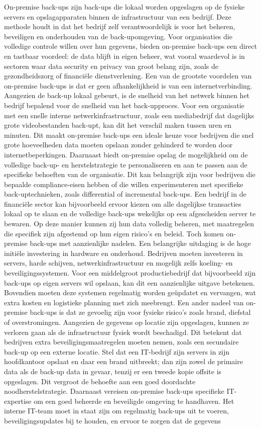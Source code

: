 On-premise back-ups zijn back-ups die lokaal worden opgeslagen op de fysieke servers en opslagapparaten binnen de infrastructuur van een bedrijf. Deze methode houdt in dat het bedrijf zelf verantwoordelijk is voor het beheren, beveiligen en onderhouden van de back-upomgeving. Voor organisaties die volledige controle willen over hun gegevens, bieden on-premise back-ups een direct en tastbaar voordeel: de data blijft in eigen beheer, wat vooral waardevol is in sectoren waar data security en privacy van groot belang zijn, zoals de gezondheidszorg of financiële dienstverlening. Een van de grootste voordelen van on-premise back-ups is dat er geen afhankelijkheid is van een internetverbinding. Aangezien de back-up lokaal gebeurt, is de snelheid van het netwerk binnen het bedrijf bepalend voor de snelheid van het back-upproces. Voor een organisatie met een snelle interne netwerkinfrastructuur, zoals een mediabedrijf dat dagelijks grote videobestanden back-upt, kan dit het verschil maken tussen uren en minuten. Dit maakt on-premise back-ups een ideale keuze voor bedrijven die snel grote hoeveelheden data moeten opslaan zonder gehinderd te worden door internetbeperkingen. Daarnaast biedt on-premise opslag de mogelijkheid om de volledige back-up- en herstelstrategie te personaliseren en aan te passen aan de specifieke behoeften van de organisatie. Dit kan belangrijk zijn voor bedrijven die bepaalde compliance-eisen hebben of die willen experimenteren met specifieke back-uptechnieken, zoals differential of incremental back-ups. Een bedrijf in de financiële sector kan bijvoorbeeld ervoor kiezen om alle dagelijkse transacties lokaal op te slaan en de volledige back-ups wekelijks op een afgescheiden server te bewaren. Op deze manier kunnen zij hun data volledig beheren, met maatregelen die specifiek zijn afgestemd op hun eigen risico’s en beleid. Toch komen on-premise back-ups met aanzienlijke nadelen. Een belangrijke uitdaging is de hoge initiële investering in hardware en onderhoud. Bedrijven moeten investeren in servers, harde schijven, netwerkinfrastructuur en mogelijk zelfs koeling- en beveiligingssystemen. Voor een middelgroot productiebedrijf dat bijvoorbeeld zijn back-ups op eigen servers wil opslaan, kan dit een aanzienlijke uitgave betekenen. Bovendien moeten deze systemen regelmatig worden geüpdatet en vervangen, wat extra kosten en logistieke planning met zich meebrengt. Een ander nadeel van on-premise back-ups is dat ze gevoelig zijn voor fysieke risico’s zoals brand, diefstal of overstromingen. Aangezien de gegevens op locatie zijn opgeslagen, kunnen ze verloren gaan als de infrastructuur fysiek wordt beschadigd. Dit betekent dat bedrijven extra beveiligingsmaatregelen moeten nemen, zoals een secundaire back-up op een externe locatie. Stel dat een IT-bedrijf zijn servers in zijn hoofdkantoor opslaat en daar een brand uitbreekt; dan zijn zowel de primaire data als de back-up data in gevaar, tenzij er een tweede kopie offsite is opgeslagen. Dit vergroot de behoefte aan een goed doordachte noodherstelstrategie. Daarnaast vereisen on-premise back-ups specifieke IT-expertise om een goed beheerde en beveiligde omgeving te handhaven. Het interne IT-team moet in staat zijn om regelmatig back-ups uit te voeren, beveiligingsupdates bij te houden, en ervoor te zorgen dat de gegevens 